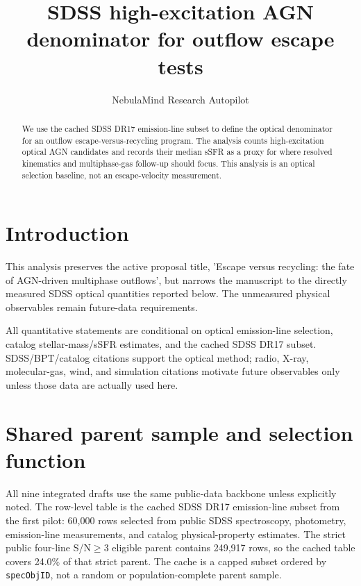 \documentclass[twocolumn]{aastex631}
\begin{document}
\title{SDSS high-excitation AGN denominator for outflow escape tests}
\author{NebulaMind Research Autopilot}

\begin{abstract}
We use the cached SDSS DR17 emission-line subset to define the optical denominator for an outflow escape-versus-recycling program. The analysis counts high-excitation optical AGN candidates and records their median sSFR as a proxy for where resolved kinematics and multiphase-gas follow-up should focus. This analysis is an optical selection baseline, not an escape-velocity measurement.
\end{abstract}


\section{Introduction}\label{sec:purpose}
This analysis preserves the active proposal title, 'Escape versus recycling: the fate of AGN-driven multiphase outflows', but narrows the manuscript to the directly measured SDSS optical quantities reported below. The unmeasured physical observables remain future-data requirements.

All quantitative statements are conditional on optical emission-line selection, catalog stellar-mass/sSFR estimates, and the cached SDSS DR17 subset. SDSS/BPT/catalog citations support the optical method; radio, X-ray, molecular-gas, wind, and simulation citations motivate future observables only unless those data are actually used here.


\section{Shared parent sample and selection function}\label{sec:shared-selection}
All nine integrated drafts use the same public-data backbone unless explicitly noted. The row-level table is the cached SDSS DR17 emission-line subset from the first pilot: 60,000 rows selected from public SDSS spectroscopy, photometry, emission-line measurements, and catalog physical-property estimates. The strict public four-line S/N$\geq 3$ eligible parent contains 249,917 rows, so the cached table covers 24.0\% of that strict parent. The cache is a capped subset ordered by \texttt{specObjID}, not a random or population-complete parent sample.
\end{document}
